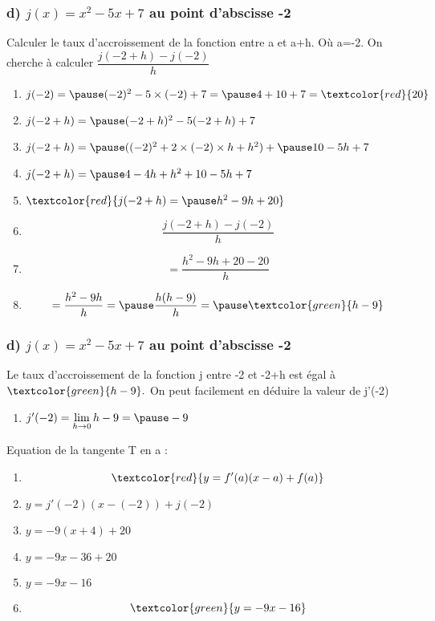 \documentclass[t]{beamer}
\begin{document}
	\begin{frame}
		\frametitle{d) $j(x) = x^2 - 5x +7$ au point d'abscisse -2}
		\pause
		Calculer le taux d'accroissement de la fonction entre a et a+h. \pause Où a=-2.
		\pause
		On cherche à calculer \( \dfrac{j(-2+h) - j(-2)}{h} \)
		\pause
		\begin{enumerate}[]
			\item \(j(-2)= \pause (-2)^2 - 5\times (-2) + 7 = \pause 4 + 10 + 7 = \textcolor{red}{20} \)
			\pause
			\item \(j(-2+h)= \pause(-2+h)^2 - 5(-2+h) + 7 \)
			\pause
			\item \(j(-2+h)= \pause ((-2)^2+ 2 \times (-2) \times h + h^2) + \pause 10 - 5h + 7 \)
			\pause
			\item \(j(-2+h)= \pause 4 - 4h + h^2 + 10 - 5h + 7 \)
			\pause
			\item \(\textcolor{red}{j(-2+h)= \pause h^2 -9h + 20} \)
			\pause
			\item \[\dfrac{j(-2+h)-j(-2)}{h}\]
			\pause
			\item \[=\dfrac{h^2-9h+20-20}{h}\]
			\pause
			\item \[=\dfrac{h^2-9h}{h} = \pause \dfrac{h(h-9)}{h} = \pause \textcolor{green}{h-9} \]
			\pause
		\end{enumerate}
	\end{frame}

	\begin{frame}
		\frametitle{d) $j(x) = x^2 - 5x +7$ au point d'abscisse -2}
		\pause
		Le taux d'accroissement de la fonction j entre -2 et -2+h est égal à \pause $\textcolor{green}{h-9}.$ \pause On peut facilement en déduire la valeur de j'(-2)
		\pause
		\begin{enumerate}[]
			\item<+-> \(j'(-2) = \lim\limits_{h \rightarrow 0}h-9 = \pause -9 \)
		\end{enumerate}
		\pause
		Equation de la tangente T en a :
		\pause
		\begin{enumerate}[]
			\item<+-> \[\textcolor{red}{y = f'(a)(x-a) + f(a)}\]
			\item<+-> \(y=j'(-2)(x-(-2)) + j(-2) \)
			\item<+-> \(y= -9(x+4) + 20\)
			\item<+-> \(y= -9x-36+20\)
			\item<+-> \(y= -9x-16 \)
			\pause
			\item<+-> \[\textcolor{green}{y = -9x-16 }\]
		\end{enumerate}
	\end{frame}
\end{document}
